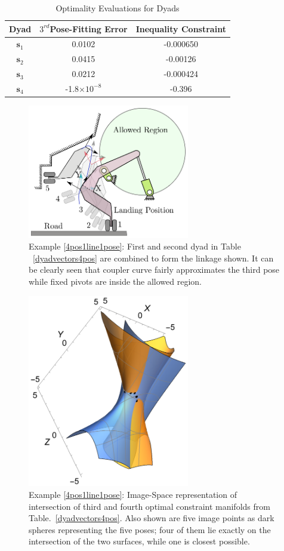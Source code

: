 \begin{table}
\caption{Optimality Evaluations for Dyads}
\centering
\label{error4pos}
\begin{tabular}{ccc}
\hline
Dyad & $3^{rd}$Pose-Fitting Error & Inequality Constraint \\
\hline
$\textbf{s}_1$ &  0.0102 & -0.000650 \\
$\textbf{s}_2$ &  0.0415 & -0.00126 \\
$\textbf{s}_3$ &  0.0212 & -0.000424 \\
$\textbf{s}_4$ & -1.8$\times10^{-8}$ &  -0.396 \\
\hline
\end{tabular}
\end{table}

\begin{figure}
\centering
\includegraphics[width=200pt]{jmr-17/figure/fig3.eps}
\caption{Example \ref{4pos1line1pose}: First and second dyad in Table ~\ref{dyadvectors4pos} are combined to form the linkage shown. It can be clearly seen that coupler curve fairly approximates the third pose while fixed pivots are inside the allowed region.}
\label{4posRRRP}
\end{figure}

\begin{figure}
\centering
\includegraphics[width=200pt]{jmr-17/figure/fig4.eps}
\caption{Example \ref{4pos1line1pose}: Image-Space representation of intersection of third and fourth optimal constraint manifolds from Table.~\ref{dyadvectors4pos}. Also shown are five image points as dark spheres representing the five poses; four of them lie exactly on the intersection of the two surfaces, while one is closest possible.}
\label{4posmanifolds}
\end{figure}

